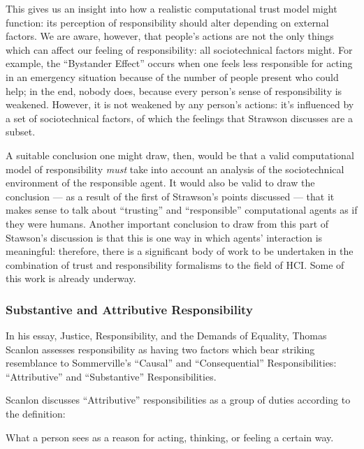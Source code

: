 This gives us an insight into how a realistic computational trust model might function: its perception of responsibility should alter depending on external factors. We are aware, however, that people's actions are not the only things which can affect our feeling of responsibility: all sociotechnical factors might. For example, the ``Bystander Effect''\cite{unresponsive_bystander} occurs when one feels less responsible for acting in an emergency situation because of the number of people present who could help; in the end, nobody does, because every person's sense of responsibility is weakened. However, it is not weakened by any person's actions: it's influenced by a set of sociotechnical factors, of which the feelings that Strawson discusses are a subset.\par

A suitable conclusion one might draw, then, would be that a valid computational model of responsibility \emph{must} take into account an analysis of the sociotechnical environment of the responsible agent. It would also be valid to draw the conclusion --- as a result of the first of Strawson's points discussed --- that it makes sense to talk about ``trusting'' and ``responsible'' computational agents as if they were humans. Another important conclusion to draw from this part of Stawson's discussion is that this is one way in which agents' interaction is meaningful: therefore, there is a significant body of work to be undertaken in the combination of trust and responsibility formalisms to the field of HCI\@. Some of this work is already underway\cite{Marsh2011, Macy2002}. \par

\subsubsection{Substantive and Attributive Responsibility}
In his essay, Justice, Responsibility, and the Demands of Equality\cite{scanlon2006justice}, Thomas Scanlon assesses responsibility as having two factors which bear striking resemblance to Sommerville's ``Causal'' and ``Consequential'' Responsibilities: ``Attributive'' and ``Substantive'' Responsibilities.\par

Scanlon discusses ``Attributive'' responsibilities as a group of duties according to the definition:
\begin{displayquote}
    What a person sees as a reason for acting, thinking, or feeling a certain way.
\end{displayquote}\par

